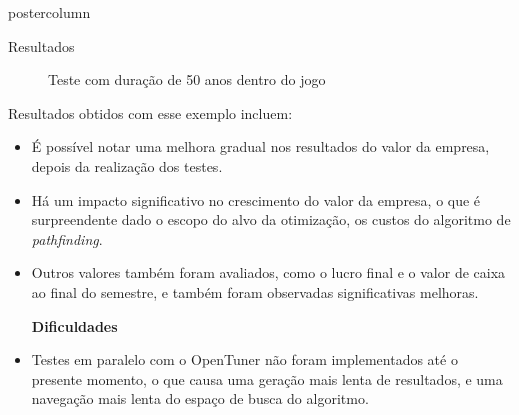 \documentclass[final]{beamer}
\begin{document}
\begin{frame}
\begin{columns}
\begin{column}{.5\textwidth}
\begin{beamercolorbox}[center,wd=\textwidth]{postercolumn}
\begin{minipage}[T]{.95\textwidth}
{\begin{block}{Resultados}
                \begin{figure}[htp]
                  \centering
                  \caption{Teste com duração de 50 anos dentro do jogo}
                \end{figure}
                
                \vspace*{0.4cm}
                
                Resultados obtidos com esse exemplo incluem:
                \begin{itemize}
                  \item É possível notar uma melhora gradual nos resultados do valor da empresa, depois da realização dos testes.
                  \item Há um impacto significativo no crescimento do valor da empresa, o que é surpreendente dado o escopo do alvo da otimização, os custos do algoritmo de \textit{pathfinding}.
                  \item Outros valores também foram avaliados, como o lucro final e o valor de caixa ao final do semestre, e também foram observadas significativas melhoras.
                  
                  \textbf{Dificuldades}
                  \item Testes em paralelo com o OpenTuner não foram implementados até o presente momento, o que causa uma geração mais lenta de resultados, e uma navegação mais lenta do espaço de busca do algoritmo.
                \end{itemize}
                
                \vspace*{0.2cm}
            \end{block}
            
}
\end{minipage}
\end{beamercolorbox}
\end{column}
\end{columns}
\end{frame}
\end{document}
